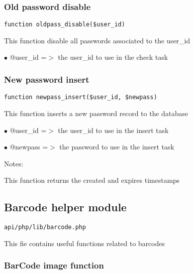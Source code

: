 \documentclass[a4paper]{article}
\begin{document}
\hypertarget{toc383}{}
\subsubsection{Old password disable}

\begin{lstlisting}
function oldpass_disable($user_id)
\end{lstlisting}

This function disable all passwords associated to the user\_id

\begin{compactitem}
\item[\color{myblue}$\bullet$] @user\_id =$>$ the user\_id to use in the check task
\end{compactitem}

\hypertarget{toc384}{}
\subsubsection{New password insert}

\begin{lstlisting}
function newpass_insert($user_id, $newpass)
\end{lstlisting}

This function inserts a new password record to the database

\begin{compactitem}
\item[\color{myblue}$\bullet$] @user\_id =$>$ the user\_id to use in the insert task
\item[\color{myblue}$\bullet$] @newpass =$>$ the password to use in the insert task
\end{compactitem}

Notes:

This function returns the created and expires timestamps

\hypertarget{toc385}{}
\subsection{Barcode helper module}

\begin{lstlisting}
api/php/lib/barcode.php
\end{lstlisting}

This fie contains useful functions related to barcodes

\hypertarget{toc386}{}
\subsubsection{BarCode image function}
\end{document}
